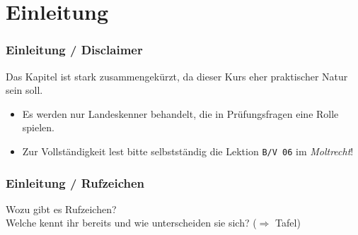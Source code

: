 

\subtitle{Betriebstechnik/Vorschriften 06: \\
          Rufzeichen - Landeskenner \\[2em]}
\date{Stand 19.11.2015}



\section{Einleitung}

\begin{frame}
    \frametitle{Einleitung / Disclaimer}

    \begin{center}
        \Large{Das Kapitel ist stark zusammengekürzt, da dieser Kurs eher
        praktischer Natur sein soll.}
    \end{center}

    \normalsize

    \begin{itemize}
        \item Es werden nur Landeskenner behandelt, die in Prüfungsfragen eine Rolle spielen.
        \item Zur Vollständigkeit lest bitte selbstständig die Lektion
              \texttt{B/V 06} im \emph{Moltrecht}!
    \end{itemize}

\end{frame}


\begin{frame}
    \frametitle{Einleitung / Rufzeichen}

    \begin{center}
        \Large{Wozu gibt es Rufzeichen?} \\[1em]
        \Large{Welche kennt ihr bereits und wie unterscheiden sie sich? ($\Rightarrow$ Tafel)}
    \end{center}

\end{frame}

%
%

